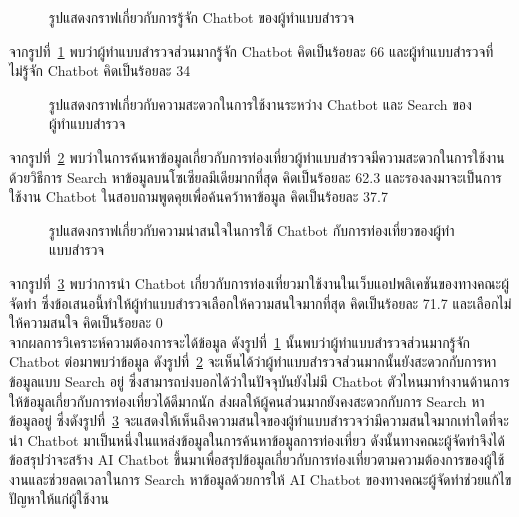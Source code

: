 \documentclass[12pt,oneside,openright,a4paper]{cpe-thai-project}
\begin{document}
\begin{figure}[!h]\centering
\setlength{\fboxrule}{0mm}
\caption{รูปแสดงกราฟเกี่ยวกับการรู้จัก Chatbot ของผู้ทำแบบสำรวจ}\label{fig:F3.9}
\end{figure}
จากรูปที่~\ref{fig:F3.9} พบว่าผู้ทำแบบสำรวจส่วนมากรู้จัก Chatbot คิดเป็นร้อยละ 66 และผู้ทำแบบสำรวจที่ไม่รู้จัก Chatbot คิดเป็นร้อยละ 34 \\

\begin{figure}[!h]\centering
\setlength{\fboxrule}{0mm}
\caption{รูปแสดงกราฟเกี่ยวกับความสะดวกในการใช้งานระหว่าง Chatbot และ Search ของผู้ทำแบบสำรวจ}\label{fig:F3.10}
\end{figure}
จากรูปที่~\ref{fig:F3.10} พบว่าในการค้นหาข้อมูลเกี่ยวกับการท่องเที่ยวผู้ทำแบบสำรวจมีความสะดวกในการใช้งานด้วยวิธีการ Search หาข้อมูลบนโซเซียลมีเดียมากที่สุด คิดเป็นร้อยละ 62.3 และรองลงมาจะเป็นการใช้งาน Chatbot ในสอบถามพูดคุยเพื่อค้นคว้าหาข้อมูล คิดเป็นร้อยละ 37.7 \newpage

\begin{figure}[!h]\centering
\setlength{\fboxrule}{0mm}
\caption{รูปแสดงกราฟเกี่ยวกับความน่าสนใจในการใช้ Chatbot กับการท่องเที่ยวของผู้ทำแบบสำรวจ}\label{fig:F3.11}
\end{figure}
จากรูปที่~\ref{fig:F3.11} พบว่าการนำ Chatbot เกี่ยวกับการท่องเที่ยวมาใช้งานในเว็บแอปพลิเคชันของทางคณะผู้จัดทำ ซึ่งข้อเสนอนี้ทำให้ผู้ทำแบบสำรวจเลือกให้ความสนใจมากที่สุด คิดเป็นร้อยละ 71.7 และเลือกไม่ให้ความสนใจ คิดเป็นร้อยละ 0 \\

จากผลการวิเคราะห์ความต้องการจะได้ข้อมูล ดังรูปที่~\ref{fig:F3.9} นั้นพบว่าผู้ทำแบบสำรวจส่วนมากรู้จัก Chatbot ต่อมาพบว่าข้อมูล ดังรูปที่~\ref{fig:F3.10} จะเห็นได้ว่าผู้ทำแบบสำรวจส่วนมากนั้นยังสะดวกกับการหาข้อมูลแบบ Search อยู่ ซึ่งสามารถบ่งบอกได้ว่าในปัจจุบันยังไม่มี Chatbot ตัวไหนมาทำงานด้านการให้ข้อมูลเกี่ยวกับการท่องเที่ยวได้ดีมากนัก ส่งผลให้ผู้คนส่วนมากยังคงสะดวกกับการ Search หาข้อมูลอยู่ ซึ่งดังรูปที่~\ref{fig:F3.11} จะแสดงให้เห็นถึงความสนใจของผู้ทำแบบสำรวจว่ามีความสนใจมากเท่าใดที่จะนำ Chatbot มาเป็นหนึ่งในแหล่งข้อมูลในการค้นหาข้อมูลการท่องเที่ยว ดังนั้นทางคณะผู้จัดทำจึงได้ข้อสรุปว่าจะสร้าง AI Chatbot ขึ้นมาเพื่อสรุปข้อมูลเกี่ยวกับการท่องเที่ยวตามความต้องการของผู้ใช้งานและช่วยลดเวลาในการ Search หาข้อมูลด้วยการให้ AI Chatbot ของทางคณะผู้จัดทำช่วยแก้ไขปัญหาให้แก่ผู้ใช้งาน

\end{document}
